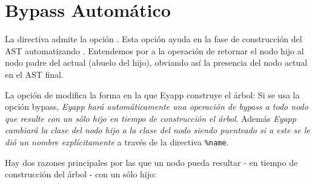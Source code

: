\section{Bypass Automático}
\label{section:bypassautomatico}
\label{section:bypass}
La directiva  admite la opción .
Esta opción ayuda en la fase de construcción del AST automatizando
.
Entendemos por  
a la operación de retornar el nodo hijo al nodo padre del actual (abuelo del hijo), 
obviando así la presencia del nodo actual en el AST final.

La opción de  modifica la forma en la que Eyapp construye el árbol:
Si se usa la opción bypass, \emph{Eyapp hará automáticamente una operación
de bypass a todo nodo que 
resulte con un sólo hijo en tiempo de construcción el árbol}.
Además \emph{Eyapp cambiará la clase del nodo hijo a la clase del
nodo siendo puenteado si a este se le dió un nombre explícitamente}
a través de la directiva \verb|%name|.

Hay dos razones principales por las que un nodo pueda resultar - en tiempo 
de construcción del árbol - con un sólo hijo:

